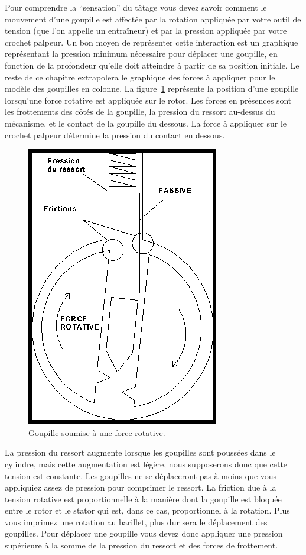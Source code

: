\documentclass[a4paper,french,11pt,twoside]{report}
\begin{document}
Pour comprendre la \enquote{sensation} du tâtage vous devez savoir comment le mouvement d'une goupille est affectée par la rotation appliquée par votre outil de tension (que l'on appelle un entraîneur) et par la pression appliquée par votre crochet palpeur. Un bon moyen de représenter cette interaction est un graphique représentant la pression minimum nécessaire pour déplacer une goupille, en fonction de la profondeur qu'elle doit atteindre à partir de sa position initiale. Le reste de ce chapitre extrapolera le graphique des forces à appliquer pour le modèle des goupilles en colonne. La figure~\ref{goupille_force_rotative} représente la position d'une goupille lorsqu'une force rotative est appliquée sur le rotor. Les forces en présences sont les frottements des côtés de la goupille, la pression du ressort au-dessus du mécanisme, et le contact de la goupille du dessous. La force à appliquer sur le crochet palpeur détermine la pression du contact en dessous.

\begin{figure}[h]
  \begin{center}
    \includegraphics[scale=0.6]{images/Image10}
    \caption{Goupille soumise à une force rotative.\label{goupille_force_rotative}}
  \end{center}
\end{figure}

La pression du ressort augmente lorsque les goupilles sont poussées dans le cylindre, mais cette augmentation est légère, nous supposerons donc que cette tension est constante. Les goupilles ne se déplaceront pas à moins que vous appliquiez assez de pression pour comprimer le ressort. La friction due à la tension rotative est proportionnelle à la manière dont la goupille est bloquée entre le rotor et le stator qui est, dans ce cas, proportionnel à la rotation. Plus vous imprimez une rotation au barillet, plus dur sera le déplacement des goupilles. Pour déplacer une goupille vous devez donc appliquer une pression supérieure à la somme de la pression du ressort et des forces de frottement.
\end{document}
